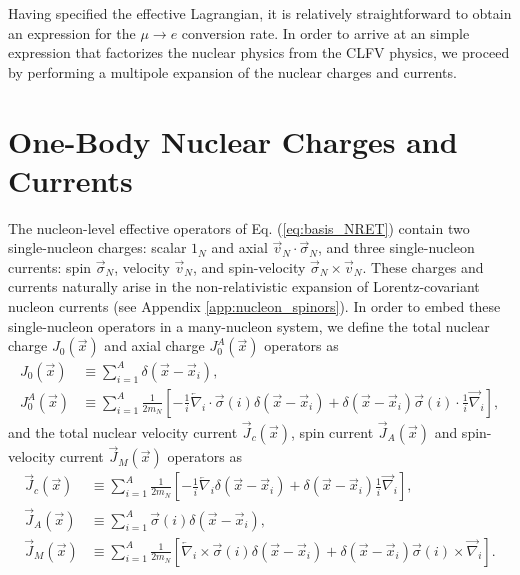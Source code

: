 \documentclass{book}[letterpaper,12pt]
\begin{document}
Having specified the effective Lagrangian, it is relatively straightforward to obtain an expression for the $\mu\rightarrow e$ conversion rate. In order to arrive at an simple expression that factorizes the nuclear physics from the CLFV physics, we proceed by performing a multipole expansion of the nuclear charges and currents. 
\section{One-Body Nuclear Charges and Currents}
The nucleon-level effective operators of Eq. (\ref{eq:basis_NRET}) contain two single-nucleon charges: scalar $1_N$ and axial $\vec{v}_N\cdot\vec{\sigma}_N$, and three single-nucleon currents: spin $\vec{\sigma}_N$, velocity $\vec{v}_N$, and spin-velocity $\vec{\sigma}_N\times\vec{v}_N$. These charges and currents naturally arise in the non-relativistic expansion of Lorentz-covariant nucleon currents (see Appendix \ref{app:nucleon_spinors}). In order to embed these single-nucleon operators in a many-nucleon system, we define the total nuclear charge $J_0(\vec{x})$ and axial charge $J_0^A(\vec{x})$ operators as
\begin{equation}
\begin{split}
J_0(\vec{x})&\equiv\sum_{i=1}^A \delta(\vec{x}-\vec{x}_i),\\
J_0^A(\vec{x})&\equiv\sum_{i=1}^A \frac{1}{2m_N}\left[-\frac{1}{i}\overleftarrow{\nabla}_i\cdot\vec{\sigma}(i)\delta(\vec{x}-\vec{x}_i)+\delta(\vec{x}-\vec{x}_i)\vec{\sigma}(i)\cdot\frac{1}{i}\overrightarrow{\nabla}_i\right],
\end{split}
\end{equation}
and the total nuclear velocity current $\vec{J}_c(\vec{x})$, spin current $\vec{J}_A(\vec{x})$ and spin-velocity current $\vec{J}_M(\vec{x})$ operators as
\begin{equation}
\begin{split}
\vec{J}_c(\vec{x})&\equiv\sum_{i=1}^A \frac{1}{2m_N}\left[-\frac{1}{i}\overleftarrow{\nabla}_i\delta(\vec{x}-\vec{x}_i)+\delta(\vec{x}-\vec{x}_i)\frac{1}{i}\overrightarrow{\nabla}_i\right],\\
\vec{J}_A(\vec{x})&\equiv\sum_{i=1}^A\vec{\sigma}(i)\delta(\vec{x}-\vec{x}_i),\\
\vec{J}_M(\vec{x})&\equiv\sum_{i=1}^A \frac{1}{2m_N}\left[\overleftarrow{\nabla}_i\times\vec{\sigma}(i)\delta(\vec{x}-\vec{x}_i)+\delta(\vec{x}-\vec{x}_i)\vec{\sigma}(i)\times\overrightarrow{\nabla}_i\right].
\end{split}
\end{equation}
\end{document}
